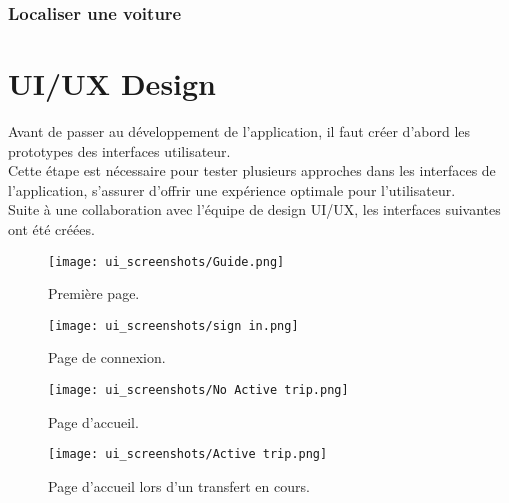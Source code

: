 \subsubsection{Localiser une voiture}
\section{UI/UX Design}
Avant de passer au développement de l'application, il faut créer d'abord les prototypes des interfaces utilisateur. \\
\noindent Cette étape est nécessaire pour tester plusieurs approches dans les interfaces de l'application, s'assurer d'offrir une expérience optimale pour l'utilisateur. \\
\noindent Suite à une collaboration avec l'équipe de design UI/UX, les interfaces suivantes ont été créées.
\vspace{1cm}
\begin{multicols}{2}
    \begin{figure}[H]
        \centering
        \texttt{[image: ui\_screenshots/Guide.png]}
        \vspace{1cm}
        \captionsetup{justification=centering}

        \caption{Première page.}
        \label{fig:start_page}
    \end{figure}
    \begin{figure}[H]
        \centering
        \texttt{[image: ui\_screenshots/sign in.png]}
        \vspace{1cm}
        \captionsetup{justification=centering}

        \caption{Page de connexion.}
        \label{fig:sign_in_page}
    \end{figure}
\end{multicols}
\begin{multicols}{2}
    \begin{figure}[H]
        \centering
        \texttt{[image: ui\_screenshots/No Active trip.png]}
        \vspace{1cm}
        \captionsetup{justification=centering}

        \caption{\centering Page d'accueil.}
        \label{fig:no_active_trip}
    \end{figure}
    \begin{figure}[H]
        \centering
        \texttt{[image: ui\_screenshots/Active trip.png]}
        \vspace{1cm}
        \captionsetup{justification=centering}

        \caption{\centering Page d'accueil lors d'un transfert en cours.}
        \label{fig:active_trip}
    \end{figure}
\end{multicols}
